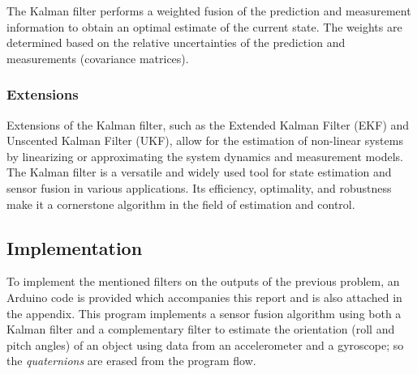 \documentclass[conference]{IEEEtran}
\begin{document}
The Kalman filter performs a weighted fusion of the prediction and measurement information to obtain an optimal estimate of the current state. The weights are determined based on the relative uncertainties of the prediction and measurements (covariance matrices).\\

\subsubsection{Extensions}

Extensions of the Kalman filter, such as the Extended Kalman Filter (EKF) and Unscented Kalman Filter (UKF), allow for the estimation of non-linear systems by linearizing or approximating the system dynamics and measurement models. \\


The Kalman filter is a versatile and widely used tool for state estimation and sensor fusion in various applications. Its efficiency, optimality, and robustness make it a cornerstone algorithm in the field of estimation and control.

\subsection{Implementation}
To implement the mentioned filters on the outputs of the previous problem, an Arduino code is provided which accompanies this report and is also attached in the appendix. This program implements a sensor fusion algorithm using both a Kalman filter\cite{b7}\cite{b8} and a complementary filter to estimate the orientation (roll and pitch angles) of an object using data from an accelerometer and a gyroscope; so the \textit{quaternions} are erased from the program flow.\\
\end{document}
